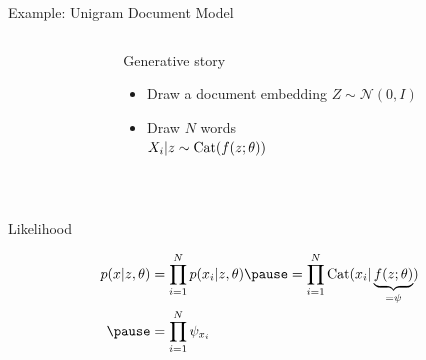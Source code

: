 \documentclass[14pt]{beamer}
\begin{document}
\begin{frame}{Example: Unigram Document Model}


\begin{columns}
	\begin{column}{0.2\textwidth}
    \end{column}
    \begin{column}{0.75\textwidth}
    	Generative story 
    	\begin{itemize}
			\item Draw a document embedding $Z \sim \mathcal N(0, I)$
			\item Draw $N$ words\\
			$X_i|z \sim \operatorname{Cat}(f(z; \theta))$
		\end{itemize}
    \end{column}
    \end{columns}
    
    
    ~
    
	Likelihood \pause
	\begin{small}
    \begin{equation*}
	\begin{aligned}						
		p(x|z, \theta) &= \prod_{i=1}^N p(x_i|z, \theta) \pause = \prod_{i=1}^N \Cat(x_i|\underbrace{f(z; \theta)}_{=\psi}) \\ \pause
		&= \prod_{i=1}^N \psi_{x_i}
	\end{aligned}
	\end{equation*}
	\end{small}

\end{frame}
\end{document}
